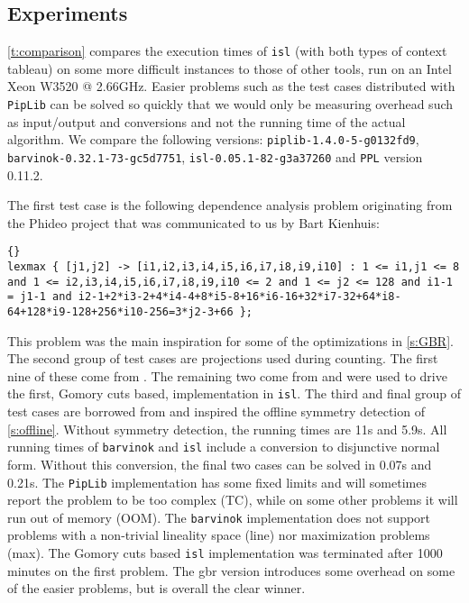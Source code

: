 \subsection{Experiments}

\autoref{t:comparison} compares the execution times of {\tt isl}
(with both types of context tableau)
on some more difficult instances to those of other tools,
run on an Intel Xeon W3520 @ 2.66GHz.
Easier problems such as the
test cases distributed with {\tt Pip\-Lib} can be solved so quickly
that we would only be measuring overhead such as input/output and conversions
and not the running time of the actual algorithm.
We compare the following versions:
{\tt piplib-1.4.0-5-g0132fd9},
{\tt barvinok-0.32.1-73-gc5d7751},
{\tt isl-0.05.1-82-g3a37260}
and {\tt PPL} version 0.11.2.

The first test case is the following dependence analysis problem
originating from the Phideo project 
that was communicated to us by Bart Kienhuis:
\begin{lstlisting}[flexiblecolumns=true,breaklines=true]{}
lexmax { [j1,j2] -> [i1,i2,i3,i4,i5,i6,i7,i8,i9,i10] : 1 <= i1,j1 <= 8 and 1 <= i2,i3,i4,i5,i6,i7,i8,i9,i10 <= 2 and 1 <= j2 <= 128 and i1-1 = j1-1 and i2-1+2*i3-2+4*i4-4+8*i5-8+16*i6-16+32*i7-32+64*i8-64+128*i9-128+256*i10-256=3*j2-3+66 };
\end{lstlisting}
This problem was the main inspiration
for some of the optimizations in \autoref{s:GBR}.
The second group of test cases are projections used during counting.
The first nine of these come from .
The remaining two come from  and
were used to drive the first, Gomory cuts based, implementation
in {\tt isl}.
The third and final group of test cases are borrowed from
 and inspired the offline symmetry detection
of \autoref{s:offline}.  Without symmetry detection, the running times
are 11s and 5.9s.
All running times of {\tt barvinok} and {\tt isl} include a conversion
to disjunctive normal form.  Without this conversion, the final two
cases can be solved in 0.07s and 0.21s.
The {\tt PipLib} implementation has some fixed limits and will
sometimes report the problem to be too complex (TC), while on some other
problems it will run out of memory (OOM).
The {\tt barvinok} implementation does not support problems
with a non-trivial lineality space (line) nor maximization problems (max).
The Gomory cuts based {\tt isl} implementation was terminated after 1000
minutes on the first problem.  The gbr version introduces some
overhead on some of the easier problems, but is overall the clear winner.

